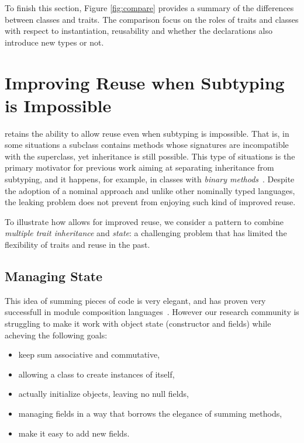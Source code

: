To finish this section, Figure \ref{fig:compare} provides a summary of
the differences between classes and traits. The comparison focus on
the roles of traits and classes with respect to instantiation,
reusability and whether the declarations also introduce new types or
not.



\section{Improving Reuse when Subtyping is Impossible}

\name retains the ability to allow reuse even when subtyping is
impossible. That is, in some situations a subclass contains methods
whose signatures are incompatible with the superclass, yet inheritance
is still possible. This type of situations is the primary motivator
for previous work aiming at separating inheritance from subtyping, and
it happens, for example, in classes with \emph{binary
  methods}~\cite{}.  Despite the adoption of a nominal approach and
unlike other nominally typed languages, the leaking problem does not
prevent \name from enjoying such kind of improved reuse.

To illustrate how \name allows for improved reuse, we consider a
pattern to combine \emph{multiple trait inheritance} and \emph{state}:
a challenging problem that has limited the flexibility of traits and
reuse in the past.

\subsection{Managing State}

This idea of summing pieces of code is very elegant, and has proven
very successfull in module composition
languages~\cite{ancona2002calculus}. 
However our research community is
struggling to make it work with object state (constructor and fields)
while acheving the following goals:

\begin{itemize}
\item keep sum associative and commutative,
\item allowing a class to create instances of itself,
\item actually initialize objects, leaving no null fields,
\item managing fields in a way that borrows the elegance of summing methods,
\item make it easy to add new fields.
\end{itemize}

